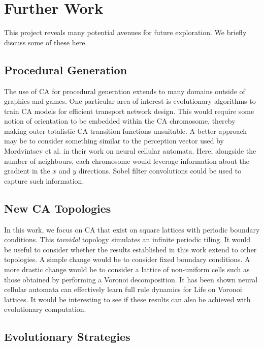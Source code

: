 \section{Further Work}

This project reveals many potential avenues for future exploration. We briefly discuss some of these here.

\subsection{Procedural Generation}

The use of CA for procedural generation extends to many domains outside of graphics and games. One particular area of interest is evolutionary algorithms to train CA models for efficient transport network design. This would require some notion of orientation to be embedded within the CA chromosome, thereby making outer-totalistic CA transition functions unsuitable. A better approach may be to consider something similar to the perception vector used by Mordvintsev et al.\cite{mordvintsev2020growing} in their work on neural cellular automata. Here, alongside the number of neighbours, each chromosome would leverage information about the gradient in the $x$ and $y$ directions. Sobel filter convolutions could be used to capture such information.

\subsection{New CA Topologies}

In this work, we focus on CA that exist on square lattices with periodic boundary conditions. This \textit{toroidal} topology simulates an infinite periodic tiling. It would be useful to consider whether the results established in this work extend to other topologies. A simple change would be to consider fixed boundary conditions. A more drastic change would be to consider a lattice of non-uniform cells such as those obtained by performing a Voronoi decomposition. It has been shown neural cellular automata can effectively learn full rule dynamics for Life on Voronoi lattices\cite{grattarola2021learning}. It would be interesting to see if these results can also be achieved with evolutionary computation.

\subsection{Evolutionary Strategies}

